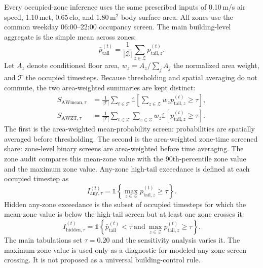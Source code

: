 Every occupied-zone inference uses the same prescribed inputs of 0.10\,m/s air speed, 1.10\,met, 0.65\,clo, and 1.80\,m$^2$ body surface area. All zones use the common weekday 06:00--22:00 occupancy screen. The main building-level aggregate is the simple mean across zones:
\begin{equation}
\bar{p}_{\mathrm{tail}}^{(t)}=\frac{1}{|\mathcal{Z}|}\sum_{z\in\mathcal{Z}}p_{\mathrm{tail},z}^{(t)} .
\end{equation}
Let $A_z$ denote conditioned floor area, $w_z=A_z/\sum_jA_j$ the normalized area weight, and $\mathcal{T}$ the occupied timesteps. Because thresholding and spatial averaging do not commute, the two area-weighted summaries are kept distinct:
\begin{equation}
\begin{aligned}
S_{\mathrm{AWmean},\tau}
&=\frac{1}{|\mathcal{T}|}\sum_{t\in\mathcal{T}}
\mathbb{1}\!\left[\sum_{z\in\mathcal{Z}}w_zp_{\mathrm{tail},z}^{(t)}\ge\tau\right],\\
S_{\mathrm{AWZT},\tau}
&=\frac{1}{|\mathcal{T}|}\sum_{t\in\mathcal{T}}\sum_{z\in\mathcal{Z}}w_z
\mathbb{1}\!\left[p_{\mathrm{tail},z}^{(t)}\ge\tau\right].
\end{aligned}
\end{equation}
The first is the area-weighted mean-probability screen: probabilities are spatially averaged before thresholding. The second is the area-weighted zone-time screened share: zone-level binary screens are area-weighted before time averaging.
The zone audit compares this mean-zone value with the 90th-percentile zone value and the maximum zone value. Any-zone high-tail exceedance is defined at each occupied timestep as
\begin{equation}
I_{\mathrm{any},\tau}^{(t)}=\mathbb{1}\left\{\max_{z\in\mathcal{Z}}p_{\mathrm{tail},z}^{(t)} \ge \tau\right\}.
\end{equation}
Hidden any-zone exceedance is the subset of occupied timesteps for which the mean-zone value is below the high-tail screen but at least one zone crosses it:
\begin{equation}
I_{\mathrm{hidden},\tau}^{(t)}=\mathbb{1}\left\{\bar{p}_{\mathrm{tail}}^{(t)}<\tau\ \mathrm{and}\ \max_{z\in\mathcal{Z}}p_{\mathrm{tail},z}^{(t)} \ge \tau\right\}.
\end{equation}
The main tabulations set $\tau=0.20$ and the sensitivity analysis varies it. The maximum-zone value is used only as a diagnostic for modeled any-zone screen crossing. It is not proposed as a universal building-control rule.

